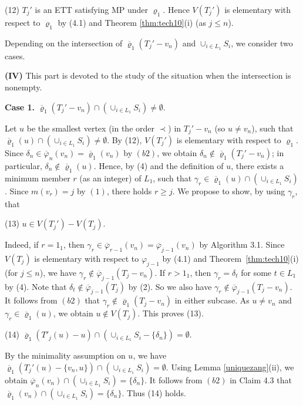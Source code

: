\documentclass[11pt]{article}
\newcommand{\rhobar}{\overline{\varrho}}
\newcommand{\phibar}{\overline{\varphi}}
\newcommand{\phiv}{\varphi}
\begin{document}
(12) $T_j'$ is an ETT satisfying MP under $\varrho_1$. Hence $V(T_j')$ is elementary with respect to $\varrho_1$ by (4.1) and Theorem 
\ref{thm:tech10}(i) (as $j \le n$). 

\vskip 2mm
Depending on the intersection of $\overline{\varrho}_1(T_j'-v_n)$ and $\cup_{i\in L_1}S_i$, we consider two cases.
\vskip 1mm

{\bf (IV)} This part is devoted to the study of the situation when the intersection is nonempty. 

\vskip 1mm
{\bf Case 1.} $\overline{\varrho}_1(T_j'-v_n)\cap (\cup_{i\in L_1}S_i)\ne \emptyset$.

\vskip 1mm
Let $u$ be the smallest vertex (in the order $\prec$) in $T_j'-v_n$ (so $u \ne v_n$), such that $\overline{\varrho}_1(u)
\cap (\cup_{i\in L_1}S_i)\neq \emptyset$. By (12), $V(T_j')$ is elementary with respect to
$\varrho_1$. Since $\delta_n\in \overline{\varphi}_n(v_n) =\overline{\varrho}_1(v_n)$ by $(b2)$, we obtain
$\delta_n\notin \overline{\varrho}_1(T_j'-v_n)$; in particular, $\delta_n\notin \overline{\varrho}_1(u)$. Hence,
by (4) and the definition of $u$, there exists a minimum member $r$ (as an integer) of $L_1$, such that
$\gamma_r \in  \overline{\varrho}_1(u) \cap (\cup_{i\in L_1}S_i)$. Since $m(v_r)=j$ by $(1)$, there holds
$r \geq j$. We propose to show, by using $\gamma_r$, that

(13) $u\in V(T_j')-V(T_j)$.

Indeed, if $r=1_1$, then $\gamma_r\in \phibar_{r-1}(v_n)=\phibar_{j-1}(v_n)$ by Algorithm 3.1. Since $V(T_j)$ is elementary with respect to 
$\phiv_{j-1}$ by (4.1) and Theorem~\ref{thm:tech10}(i) (for $j\leq n$),  we have $\gamma_r\notin \phibar_{j-1}(T_j - v_n)$. If $r > 1_1$, 
then $\gamma_r = \delta_t$ for some $t\in L_1$ by (4). Note that $\delta_t\notin \phibar_{j-1}(T_j)$ by (2). So we also have 
$\gamma_r\notin \phibar_{j-1}(T_j - v_n)$. It follows from $(b2)$ that $\gamma_r\notin \rhobar_1(T_j-v_n)$ in either subcase.  As 
$u\neq v_n$ and $\gamma_r\in \rhobar_1(u)$, we obtain $u \notin V(T_j)$. This proves (13).

(14) $\rhobar_1(T'_j(u)-u)\cap (\cup_{i \in L_1} S_i-\{\delta_n\}) = \emptyset$. 

By the minimality assumption on $u$, we have  $\overline{\varrho}_1(T_j'(u)-\{v_n,u\}) \cap (\cup_{i\in L_1}S_i)=\emptyset$. 
Using Lemma \ref{uniquezang}(ii), we obtain $\phibar_n(v_n) \cap (\cup_{i \in L_1} S_i)=\{\delta_n\}$. It follows
from $(b2)$ in Claim 4.3 that $\overline{\varrho}_1(v_n) \cap (\cup_{i \in L_1} S_i)=\{\delta_n\}$. Thus
(14) holds. 
\end{document}
